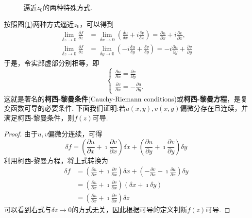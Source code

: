 \begin{figure}
    \centering
    
    \caption{逼近$z_0$的两种特殊方式.}
    \label{fig:limits}
\end{figure}
按照图(\ref{fig:limits})两种方式逼近$z_0$，可以得到
\begin{align}
    \lim _{\delta z \rightarrow 0} \frac{\delta f}{\delta z} &=\lim _{\delta x \rightarrow 0}\left(\frac{\delta u}{\delta x}+i \frac{\delta v}{\delta x}\right)=\frac{\partial u}{\partial x}+i \frac{\partial v}{\partial x},
\\
    \lim _{\delta z \rightarrow 0} \frac{\delta f}{\delta z} &=\lim _{\delta y \rightarrow 0}\left(-i \frac{\delta u}{\delta y}+\frac{\delta v}{\delta y}\right)=-i \frac{\partial u}{\partial y}+\frac{\partial v}{\partial y}
\end{align}
于是，令实部虚部分别相等，即
\begin{equation}
    \begin{cases}
        \frac{\partial u}{\partial x}=\frac{\partial v}{\partial y} \\
        \frac{\partial v}{\partial x}=-\frac{\partial u}{\partial y} .
    \end{cases}
\end{equation}
这就是著名的{\bf 柯西-黎曼条件}(Cauchy-Riemann conditions)或{\bf 柯西-黎曼方程}，是复变函数可导的必要条件.
下面我们证明:若$u(x,y), v(x,y)$偏微分存在且连续，并满足柯西-黎曼条件，则$f(z)$可导.
\begin{proof}
    由于$u,v$偏微分连续，可得
    \begin{equation*}
        \delta f=\left(\frac{\partial u}{\partial x}+\imath \frac{\partial v}{\partial x}\right) \delta x+\left(\frac{\partial u}{\partial y}+ \imath \frac{\partial v}{\partial y}\right) \delta y
    \end{equation*}
    利用柯西-黎曼方程，将上式转换为
    \begin{equation*}
        \begin{aligned}
        \delta f & =\left(\frac{\partial u}{\partial x}+ \imath \frac{\partial v}{\partial x}\right) \delta x+\left(-\frac{\partial v}{\partial x}+ \imath\frac{\partial u}{\partial x}\right) \delta y \\
        & =\left(\frac{\partial u}{\partial x}+ \imath \frac{\partial v}{\partial x}\right)(\delta x+ \imath \delta y) 
        \\
        & = \left(\frac{\partial u}{\partial x}+ \imath \frac{\partial v}{\partial x}\right) \delta z
        \end{aligned}
    \end{equation*}
可以看到右式与$\delta z\to 0$的方式无关，因此根据可导的定义判断$f(z)$可导.
\end{proof}
